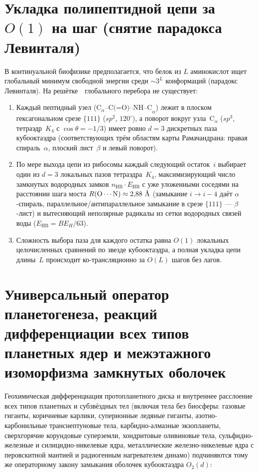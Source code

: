 \section{Укладка полипептидной цепи за \texorpdfstring{$O(1)$}{O(1)} на шаг (снятие парадокса Левинталя)}
\label{sec:chem-o1-folding}

В континуальной биофизике предполагается, что белок из $L$ аминокислот ищет глобальный минимум свободной энергии среди $\sim 3^L$ конформаций (парадокс Левинталя).
На решётке~\latGCKshort\ глобального перебора не существует:
\begin{enumerate}[noitemsep]
\item Каждый пептидный узел ($\text{C}_\alpha\text{--C(=O)--NH--C}_\alpha$) лежит в плоском гексагональном срезе $\{111\}$ ($sp^2$, $120^\circ$), а поворот вокруг узла~$\text{C}_\alpha$ ($sp^3$, тетраэдр~$K_4$ с $\cos\theta=-1/3$) имеет ровно $d=3$ дискретных паза кубооктаэдра (соответствующих трём областям карты Рамачандрана: правая спираль~$\alpha$, плоский лист~$\beta$ и левый поворот).
\item По мере выхода цепи из рибосомы каждый следующий остаток~$i$ выбирает один из $d=3$ локальных пазов тетраэдра~$K_4$, максимизирующий число замкнутых водородных замков $n_{\mathrm{HB}}\cdot E_{\mathrm{HB}}$ с уже уложенными соседями на расстоянии шага моста $R(\text{O}\cdots\text{N})\approx 2{,}88\ \text{\normalfont\AA}$ (замыкание $i\to i-4$ даёт $\alpha$-спираль, параллельное/антипараллельное замыкание в срезе $\{111\}$ --- $\beta$-лист) и вытесняющий неполярные радикалы из сетки водородных связей воды ($E_{\mathrm{HB}}=BE_H/63$).
\item Сложность выбора паза для каждого остатка равна $O(1)$ локальных целочисленных сравнений по звезде кубооктаэдра, а полная укладка цепи длины~$L$ происходит ко-трансляционно за $O(L)$ шагов без лагов.
\end{enumerate}

\section{Универсальный оператор планетогенеза, реакций дифференциации всех типов планетных ядер и межэтажного изоморфизма замкнутых оболочек}
\label{sec:chem-planetogenesis-operator}

Геохимическая дифференциация протопланетного диска и внутреннее расслоение всех типов планетных и субзвёздных тел (включая тела без биосферы: газовые гиганты, коричневые карлики, суперионные ледяные гиганты, азотно-карбонильные транснептуновые тела, карбидно-алмазные экзопланеты, сверхгорячие корундовые суперземли, хондритовые оливиновые тела, сульфидно-железные и силицидно-никелевые ядра, металлические железно-никелевые ядра с перовскитной мантией и радиогенным нагревателем динамо) подчиняются тому же операторному закону замыкания оболочек кубооктаэдра $O_2(d)$:

